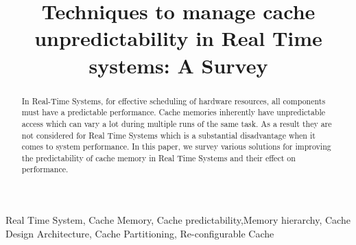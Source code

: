 \documentclass[conference]{IEEEtran}
\begin{document}
\title{Techniques to manage cache unpredictability in Real Time systems: A Survey\\}

\author{
}

\maketitle

\begin{abstract}
    In Real-Time Systems, for effective scheduling of hardware resources, all components must have a predictable performance.  Cache memories inherently have unpredictable access which can vary a lot during multiple runs of the same task. As a result they are not considered for Real Time Systems which is a substantial disadvantage when it comes to system performance. In this paper, we survey various solutions for improving the predictability of cache memory in Real Time Systems and their effect on performance.
\end{abstract}
\bigskip
\begin{IEEEkeywords}
    Real Time System, Cache Memory, Cache predictability,Memory hierarchy, Cache Design Architecture, Cache Partitioning, Re-configurable Cache
\end{IEEEkeywords}
\end{document}
